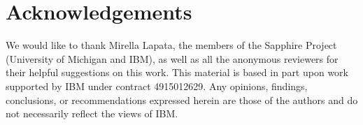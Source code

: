\documentclass[11pt,a4paper]{article}
\begin{document}
\section*{Acknowledgements}
We would like to thank Mirella Lapata, the members of the Sapphire Project (University of Michigan and IBM), as
well as all the anonymous reviewers for their
helpful suggestions on this work. This material is based in part upon work
supported by IBM under contract 4915012629. Any opinions, findings,
conclusions, or recommendations expressed herein are those of the authors and
do not necessarily reflect the views of IBM.





\end{document}
